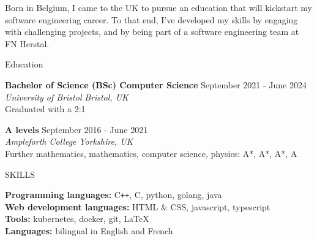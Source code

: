 \documentclass{resume} %
\begin{document}


{Born in Belgium, I came to the UK to pursue an education that will kickstart my software engineering career. To that end, I've developed my skills by engaging with challenging projects, and by being part of a software engineering team at FN Herstal.}



\begin{rSection}{Education}

{\bf Bachelor of Science (BSc) Computer Science} \hfill {September 2021 - June 2024} \\
\textit{University of Bristol} \hfill \textit{Bristol, UK} \\
Graduated with a 2:1

{\bf A levels} \hfill {September 2016 - June 2021} \\
\textit{Ampleforth College} \hfill \textit{Yorkshire, UK} \\
Further mathematics, mathematics, computer science, physics: A*, A*, A*, A

\end{rSection}

\begin{rSection}{SKILLS}

{\bf Programming languages:} C\texttt{++}, C, python, golang, java \\
{\bf Web development languages:} HTML \& CSS, javascript, typescript \\
{\bf Tools:} kubernetes, docker, git, LaTeX \\
{\bf Languages:} bilingual in English and French

\end{rSection}
\end{document}
